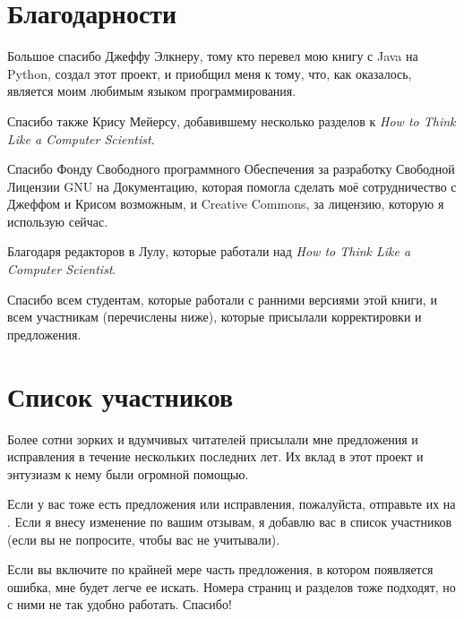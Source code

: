 \section{Благодарности}

Большое спасибо Джеффу Элкнеру, тому кто перевел мою книгу с Java на Python,
создал этот проект, и приобщил меня к тому, что, как оказалось, является моим
любимым языком программирования.
\bigskip

Спасибо также Крису Мейерсу, добавившему несколько разделов к \emph{How to Think
Like a Computer Scientist}.
\bigskip

Спасибо Фонду Свободного программного Обеспечения за разработку Свободной
Лицензии GNU на Документацию, которая помогла сделать моё сотрудничество с
Джеффом и Крисом возможным, и Creative Commons, за лицензию, которую я использую
сейчас.
\bigskip

Благодаря редакторов в Лулу, которые работали над \emph{How to Think Like a
Computer Scientist}.
\bigskip

Спасибо всем студентам, которые работали с ранними версиями этой книги, и всем
участникам (перечислены ниже), которые присылали корректировки и предложения.
\bigskip

\section{Список участников}

Более сотни зорких и вдумчивых читателей присылали мне предложения и исправления
в течение нескольких последних лет. Их вклад в этот проект и энтузиазм к нему
были огромной помощью.

Если у вас тоже есть предложения или исправления, пожалуйста, отправьте их на
. Если я внесу изменение по вашим отзывам, я
добавлю вас в список участников (если вы не попросите, чтобы вас не учитывали).
 
Если вы включите по крайней мере часть предложения, в котором появляется ошибка,
мне будет легче ее искать. Номера страниц и разделов тоже подходят, но с ними не
так удобно работать. Спасибо!

